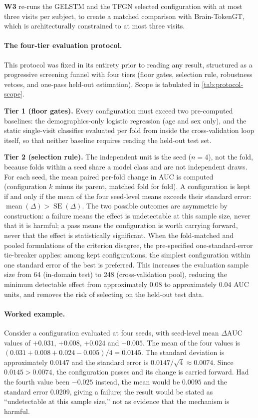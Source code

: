 \textbf{W3} re-runs the \ac{GELSTM} and the \ac{TFGN} selected configuration with
at most three visits per subject, to create a matched comparison with Brain-TokenGT, which is
architecturally constrained to at most three visits.

\paragraph{The four-tier evaluation protocol.}
This protocol was fixed in its entirety prior to reading any result, structured as a progressive screening funnel with four tiers (floor gates, selection rule, robustness vetoes, and one-pass held-out estimation). Scope is tabulated in \autoref{tab:protocol-scope}.

\textbf{Tier 1 (floor gates).} Every configuration must exceed two pre-computed baselines: the
demographics-only logistic regression (age and sex only), and the static single-visit
classifier evaluated per fold from inside the cross-validation loop itself, so that
neither baseline requires reading the held-out test set.

\textbf{Tier 2 (selection rule).} The independent unit is the seed ($n = 4$), not the
fold, because folds within a seed share a model class and are not independent draws. For
each seed, the mean paired per-fold change in \ac{AUC} is computed (configuration $k$ minus its
parent, matched fold for fold). A configuration is kept if and only if the mean of the four
seed-level means exceeds their standard error:
$\operatorname{mean}(\Delta) > \operatorname{SE}(\Delta)$.
The two possible outcomes are asymmetric by construction: a failure means the effect is
undetectable at this sample size, never that it is harmful; a pass means the configuration is worth
carrying forward, never that the effect is statistically significant. When the fold-matched
and pooled formulations of the criterion disagree, the pre-specified one-standard-error
tie-breaker applies: among kept configurations, the simplest configuration within one standard error
of the best is preferred. This increases the evaluation sample size from 64 (in-domain test) to 248 (cross-validation pool),
reducing the minimum detectable effect from approximately 0.08 to approximately 0.04
\ac{AUC} units, and removes the risk of selecting on the held-out test data.

\paragraph{Worked example.}
Consider a configuration evaluated at four seeds, with seed-level mean $\Delta$\ac{AUC} values of
$+0.031$, $+0.008$, $+0.024$ and $-0.005$. The mean of the four values is
$(0.031 + 0.008 + 0.024 - 0.005)/4 = 0.0145$. The standard deviation is approximately
$0.0147$ and the standard error is $0.0147/\sqrt{4} \approx 0.0074$. Since
$0.0145 > 0.0074$, the configuration passes and its change is carried forward. Had the fourth value
been $-0.025$ instead, the mean would be $0.0095$ and the standard error $0.0209$, giving
a failure; the result would be stated as ``undetectable at this sample size,'' not as
evidence that the mechanism is harmful.

